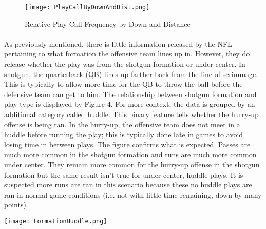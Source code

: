 \documentclass[11pt]{article}
\newenvironment{Figure}
  {\par\medskip\noindent\minipage{\linewidth}}
  {\endminipage\par\medskip}
\begin{document}
                \begin{figure}[ht]
                    \texttt{[image: PlayCallByDownAndDist.png]}
                    \caption{Relative Play Call Frequency by Down and Distance}
                    \label{fig:Play Calls}
                \end{figure}
                \begin{multicols*}{2}
                
                \paragraph{}
                    As previously mentioned, there is little information released by the NFL pertaining to what formation the offensive team lines up in.
                    However, they do release whether the play was from the shotgun formation or under center. 
                    In shotgun, the quarterback (QB) lines up farther back from the line of scrimmage. 
                    This is typically to allow more time for the QB to throw the ball before the defensive team can get to him. 
                    The relationship between shotgun formation and play type is displayed by Figure 4. 
                    For more context, the data is grouped by an additional category called huddle.
                    This binary feature tells whether the hurry-up offense is being ran. 
                    In the hurry-up, the offensive team does not meet in a huddle before running the play; this is typically done late in games to avoid losing time in between plays. 
                    The figure confirms what is expected. 
                    Passes are much more common in the shotgun formation and runs are much more common under center. 
                    They remain more common for the hurry-up offense in the shotgun formation but the same result isn't true for under center, huddle plays. 
                    It is suspected more runs are ran in this scenario because these no huddle plays are ran in normal game conditions (i.e. not with little time remaining, down by many points). 

                \begin{Figure}  
                    \centering
                    \texttt{[image: FormationHuddle.png]}
                    \label{fig:Play Type by Formation and Huddle}
                \end{Figure}


\end{multicols*}
\end{document}
